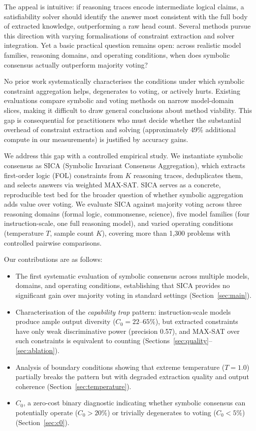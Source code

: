 \documentclass[11pt]{article}
\begin{document}
The appeal is intuitive: if reasoning traces encode intermediate logical claims, a satisfiability solver should identify the answer most consistent with the full body of extracted knowledge, outperforming a raw head count.
Several methods pursue this direction with varying formalisations of constraint extraction and solver integration.
Yet a basic practical question remains open: across realistic model families, reasoning domains, and operating conditions, when does symbolic consensus actually outperform majority voting?

No prior work systematically characterises the conditions under which symbolic constraint aggregation helps, degenerates to voting, or actively hurts.
Existing evaluations compare symbolic and voting methods on narrow model-domain slices, making it difficult to draw general conclusions about method viability.
This gap is consequential for practitioners who must decide whether the substantial overhead of constraint extraction and solving (approximately 49\% additional compute in our measurements) is justified by accuracy gains.

We address this gap with a controlled empirical study.
We instantiate symbolic consensus as SICA (Symbolic Invariant Consensus Aggregation), which extracts first-order logic (FOL) constraints from $K$ reasoning traces, deduplicates them, and selects answers via weighted MAX-SAT.
SICA serves as a concrete, reproducible test bed for the broader question of whether symbolic aggregation adds value over voting.
We evaluate SICA against majority voting across three reasoning domains (formal logic, commonsense, science), five model families (four instruction-scale, one full reasoning model), and varied operating conditions (temperature $T$, sample count $K$), covering more than 1{,}300 problems with controlled pairwise comparisons.

Our contributions are as follows:
\begin{itemize}[nosep,leftmargin=1.5em]
\item The first systematic evaluation of symbolic consensus across multiple models, domains, and operating conditions, establishing that SICA provides no significant gain over majority voting in standard settings (Section~\ref{sec:main}).
\item Characterisation of the \emph{capability trap} pattern: instruction-scale models produce ample output diversity ($C_0{=}22$--$65\%$), but extracted constraints have only weak discriminative power (precision 0.57), and MAX-SAT over such constraints is equivalent to counting (Sections~\ref{sec:quality}--\ref{sec:ablation}).
\item Analysis of boundary conditions showing that extreme temperature ($T{=}1.0$) partially breaks the pattern but with degraded extraction quality and output coherence (Section~\ref{sec:temperature}).
\item $C_0$, a zero-cost binary diagnostic indicating whether symbolic consensus can potentially operate ($C_0{>}20\%$) or trivially degenerates to voting ($C_0{<}5\%$) (Section~\ref{sec:c0}).
\end{itemize}
\end{document}
